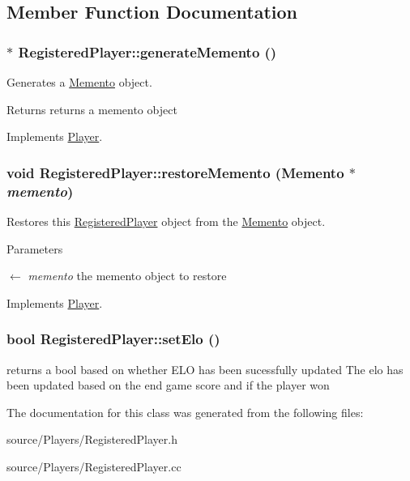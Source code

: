 \subsection{Member Function Documentation}
\hypertarget{classRegisteredPlayer_ab9436dac85b13fe2ad6849eb4efb02b8}{
\subsubsection[{generateMemento}]{ $\ast$ RegisteredPlayer::generateMemento ()}}
\label{classRegisteredPlayer_ab9436dac85b13fe2ad6849eb4efb02b8}


Generates a \hyperlink{classMemento}{Memento} object. \begin{DoxyReturn}{Returns}
returns a memento object 
\end{DoxyReturn}


Implements \hyperlink{classPlayer_ae0b947230fe2f09d96f273798f19cf0d}{Player}.\hypertarget{classRegisteredPlayer_a2a588dca8f68c5d72b4f73312f017c4d}{
\subsubsection[{restoreMemento}]{\setlength{\rightskip}{0pt plus 5cm}void RegisteredPlayer::restoreMemento ({\bf Memento} $\ast$ {\em memento})}}
\label{classRegisteredPlayer_a2a588dca8f68c5d72b4f73312f017c4d}


Restores this \hyperlink{classRegisteredPlayer}{RegisteredPlayer} object from the \hyperlink{classMemento}{Memento} object. 
\begin{DoxyParams}{Parameters}
\item[\mbox{$\leftarrow$} {\em memento}]the memento object to restore \end{DoxyParams}


Implements \hyperlink{classPlayer_a9c4f1a1eef2fbfda4b6e19e97be91877}{Player}.\hypertarget{classRegisteredPlayer_aae6a64176b51f7e7b3b1ef745c9f1119}{
\subsubsection[{setElo}]{\setlength{\rightskip}{0pt plus 5cm}bool RegisteredPlayer::setElo ()}}
\label{classRegisteredPlayer_aae6a64176b51f7e7b3b1ef745c9f1119}
returns a bool based on whether ELO has been sucessfully updated The elo has been updated based on the end game score and if the player won 

The documentation for this class was generated from the following files:\begin{DoxyCompactItemize}
\item 
source/Players/RegisteredPlayer.h\item 
source/Players/RegisteredPlayer.cc\end{DoxyCompactItemize}
